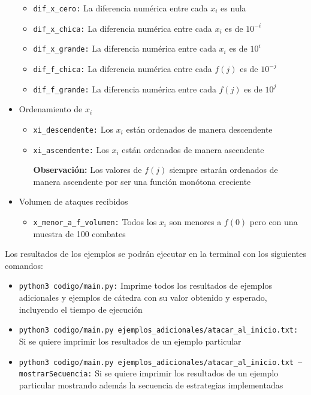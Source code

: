 \documentclass{article}
\begin{document}
\begin{itemize}
    \begin{itemize}
        \item \texttt{dif\_x\_cero:} La diferencia numérica entre cada $x_i$ es nula
        \item \texttt{dif\_x\_chica:} La diferencia numérica entre cada $x_i$ es de $10^{-i}$
        \item \texttt{dif\_x\_grande:} La diferencia numérica entre cada $x_i$ es de $10^i$
        \item \texttt{dif\_f\_chica:} La diferencia numérica entre cada $f(j)$ es de $10^{-j}$
        \item \texttt{dif\_f\_grande:} La diferencia numérica entre cada $f(j)$ es de $10^j$
    \end{itemize}
    \item Ordenamiento de $x_i$
    \begin{itemize}
        \item \texttt{xi\_descendente:} Los $x_i$ están ordenados de manera descendente
        \item \texttt{xi\_ascendente:} Los $x_i$ están ordenados de manera ascendente
        
        \textbf{Observación: }Los valores de $f(j)$ siempre estarán ordenados de manera ascendente por ser una función monótona creciente
    \end{itemize}
    \item Volumen de ataques recibidos
    \begin{itemize}
        \item \texttt{x\_menor\_a\_f\_volumen:} Todos los $x_i$ son menores a $f(0)$ pero con una muestra de 100 combates
    \end{itemize}
\end{itemize}

Los resultados de los ejemplos se podrán ejecutar en la terminal con los siguientes comandos:

\begin{itemize}
    \item \texttt{python3 codigo/main.py:} Imprime todos los resultados de ejemplos adicionales y ejemplos de cátedra con su valor obtenido y esperado, incluyendo el tiempo de ejecución
    \item \texttt{python3 codigo/main.py ejemplos\_adicionales/atacar\_al\_inicio.txt:} Si se quiere imprimir los resultados de un ejemplo particular
    \item \texttt{python3 codigo/main.py ejemplos\_adicionales/atacar\_al\_inicio.txt --mostrarSecuencia:} Si se quiere imprimir los resultados de un ejemplo particular mostrando además la secuencia de estrategias implementadas
\end{itemize}
\end{document}
